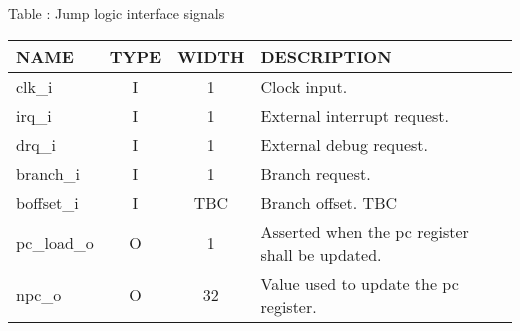 {
  \vspace{0.5em}
  \begin{center}
    Table \thetable: Jump logic interface signals\label{tab:ifm-interface}
  \end{center}

\footnotesize
\begin{xltabular}{0.9\textwidth}{|l|c|c|X|}
  \hline
  \textbf{NAME} & \textbf{TYPE} & \textbf{WIDTH} & \textbf{DESCRIPTION} \\
  \hline
  clk\_i & I & 1 & Clock input. \\
  \hline
  irq\_i & I & 1 & External interrupt request. \\
  \hline
  drq\_i & I & 1 & External debug request. \\
  \hline
  branch\_i & I & 1 & Branch request. \\
  \hline
  boffset\_i & I & TBC & Branch offset. TBC \\
  \hline
  pc\_load\_o & O & 1 & Asserted when the pc register shall be updated. \\
  \hline
  npc\_o & O & 32 & Value used to update the pc register. \\
  \hline
\end{xltabular}
}
